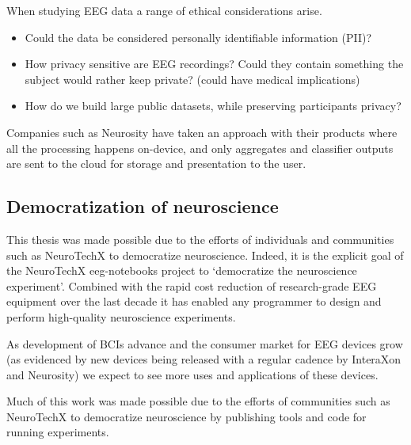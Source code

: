     When studying EEG data a range of ethical considerations arise. 

    \begin{itemize}
        \item Could the data be considered personally identifiable information (PII)? 
        \item How privacy sensitive are EEG recordings? Could they contain something the subject would rather keep private? (could have medical implications)
        \item How do we build large public datasets, while preserving participants privacy?
    \end{itemize}

    Companies such as Neurosity have taken an approach with their products where all the processing happens on-device, and only aggregates and classifier outputs are sent to the cloud for storage and presentation to the user.



\subsection{Democratization of neuroscience}

    This thesis was made possible due to the efforts of individuals and communities such as NeuroTechX to democratize neuroscience. Indeed, it is the explicit goal of the NeuroTechX eeg-notebooks project to `democratize the neuroscience experiment'. Combined with the rapid cost reduction of research-grade EEG equipment over the last decade it has enabled any programmer to design and perform high-quality neuroscience experiments.

    As development of BCIs advance and the consumer market for EEG devices grow (as evidenced by new devices being released with a regular cadence by InteraXon and Neurosity) we expect to see more uses and applications of these devices.

    Much of this work was made possible due to the efforts of communities such as NeuroTechX to democratize neuroscience by publishing tools and code for running experiments.


